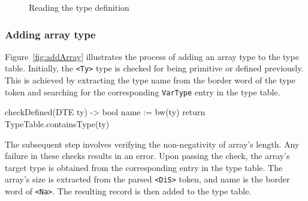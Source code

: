 \begin{figure}[h]
    \centering
    \caption{Reading the type definition}
    \label{fig:readTyD}
\end{figure}

\newpage

\subsubsection{Adding array type}
Figure~\ref{fig:addArray} illustrates the process of adding an array type to the type table.
Initially, the \verb+<Ty>+ type is checked for being primitive or defined previously.
This is achieved by extracting the type name from the border word of the type token and searching for the corresponding \verb+VarType+ entry in the type table.
\begin{codeblock}
    checkDefined(DTE ty) -> bool {
        name := bw(ty)
        return TypeTable.containsType(ty)
    }
\end{codeblock}
The subsequent step involves verifying the non-negativity of array's length.
Any failure in these checks results in an error.
Upon passing the check, the array's target type is obtained from the corresponding entry in the type table.
The array's size is extracted from the parsed \verb+<DiS>+ token, and name is the border word of \verb+<Na>+.
The resulting record is then added to the type table.

